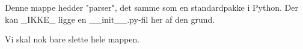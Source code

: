 Denne mappe hedder "parser", det samme som en standardpakke i Python.
Der kan _IKKE_ ligge en __init__.py-fil her af den grund.

Vi skal nok bare slette hele mappen.
